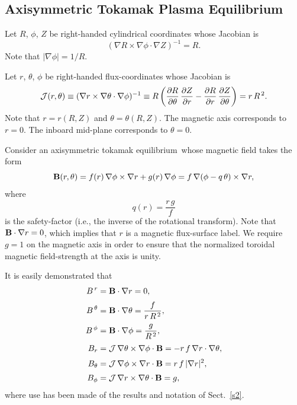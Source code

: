 \documentclass[12pt,prb,aps]{revtex4-1}
\begin{document}
\subsection{Axisymmetric Tokamak Plasma Equilibrium}\label{s3}
Let $R$, $\phi$, $Z$ be right-handed cylindrical coordinates whose Jacobian 
is
\begin{equation}
(\nabla R\times \nabla\phi\cdot\nabla Z)^{-1} = R.
\end{equation}
Note that $|\nabla\phi|=1/R$. 

Let $r$, $\theta$, $\phi$ be right-handed flux-coordinates whose
Jacobian is\,\cite{connor,bussac}
\begin{equation}\label{jac}
{\cal J}(r,\theta)\equiv (\nabla r\times \nabla\theta\cdot\nabla\phi)^{-1} \equiv R\left(\frac{\partial R}{\partial\theta}\,\frac{\partial Z}{\partial r} -\frac{\partial R}{\partial r}\,\frac{\partial Z}{\partial \theta}\right)= r\,R^{\,2}.
\end{equation}
Note that $r=r(R,Z)$ and $\theta=\theta(R,Z)$. 
The magnetic axis corresponds to $r=0$. The inboard mid-plane corresponds to $\theta=0$. 

Consider an axisymmetric tokamak equilibrium\,\cite{gs1} whose magnetic field takes the form\,\cite{connor,am1}
\begin{equation}
{\bf B}(r,\theta) = f(r)\,\nabla\phi\times \nabla r + g(r)\,\nabla\phi = f\,\nabla(\phi-q\,\theta)\times \nabla r,
\end{equation}
where
\begin{equation}\label{q}
q(r) = \frac{r\,g}{f}
\end{equation}
is the safety-factor (i.e., the inverse of the rotational transform). Note that ${\bf B}\cdot\nabla r=0$, which implies that $r$ is a magnetic flux-surface label.
We require $g=1$ on the magnetic axis in order to ensure that the normalized toroidal magnetic field-strength at the  axis is unity.  

It is easily demonstrated that
\begin{align}
B^{\,r}&={\bf B}\cdot\nabla r= 0,\label{bup1}\\[0.5ex]
B^{\,\theta} &={\bf B}\cdot\nabla \theta= \frac{f}{r\,R^{\,2}},\label{bup2}\\[0.5ex]
B^{\,\phi} &={\bf B}\cdot\nabla \phi= \frac{g}{R^{\,2}},\label{bup3}\\[0.5ex]
B_r &={\cal J}\,\nabla\theta\times\nabla\phi\cdot{\bf B}= -r\,f\,\nabla r\cdot\nabla\theta,\label{bdown1}\\[0.5ex]
B_\theta &={\cal J}\,\nabla\phi\times\nabla r\cdot{\bf B}= r\,f\,|\nabla r|^2,\\[0.5ex]
B_\phi &={\cal J}\,\nabla r\times\nabla \theta \cdot{\bf B}= g,\label{bdown3}
\end{align}
where use has been made of the results and notation of Sect.~\ref{s2}. 
\end{document}
